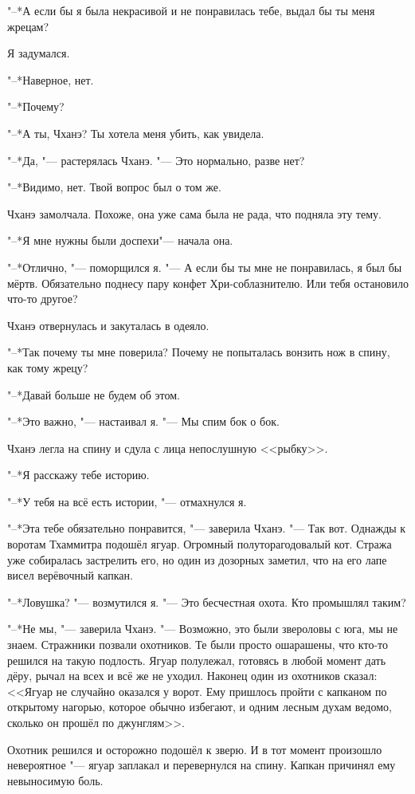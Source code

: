 \documentclass[a4paper,10pt]{book}
\newcommand{\ldotst}{\so{...}\xspace}
\begin{document}
"--*А если бы я была некрасивой и не понравилась тебе, выдал бы ты меня жрецам?

Я задумался.

"--*Наверное, нет.

"--*Почему?

"--*А ты, Чханэ? Ты хотела меня убить, как увидела.

"--*Да, "--- растерялась Чханэ. "--- Это нормально, разве нет?

"--*Видимо, нет. Твой вопрос был о том же.

Чханэ замолчала. Похоже, она уже сама была не рада, что подняла эту тему.

"--*Я\ldotst мне нужны были доспехи\ldotst "--- начала она.

"--*Отлично, "--- поморщился я. "--- А если бы ты мне не понравилась, я был бы 
мёртв. 
Обязательно поднесу пару конфет Хри-соблазнителю. Или тебя остановило что-то 
другое?

Чханэ отвернулась и закуталась в одеяло.

"--*Так почему ты мне поверила? Почему не попыталась вонзить нож в спину, как 
тому жрецу?

"--*Давай больше не будем об этом.

"--*Это важно, "--- настаивал я. "--- Мы спим бок о бок.

Чханэ легла на спину и сдула с лица непослушную <<рыбку>>.

"--*Я расскажу тебе историю.

"--*У тебя на всё есть истории, "--- отмахнулся я.

"--*Эта тебе обязательно понравится, "--- заверила Чханэ. "--- Так вот. Однажды 
к 
воротам Тхаммитра подошёл ягуар. Огромный полуторагодовалый кот. Стража уже 
собиралась застрелить его, но один из дозорных заметил, что на его лапе висел 
верёвочный капкан.

"--*Ловушка? "--- возмутился я. "--- Это бесчестная охота. Кто промышлял таким?

"--*Не мы, "--- заверила Чханэ. "--- Возможно, это были звероловы с юга, мы не 
знаем. Стражники позвали охотников. Те были просто ошарашены, что кто-то 
решился на такую подлость. Ягуар полулежал, готовясь в любой момент дать дёру, 
рычал на всех и всё же не уходил. Наконец один из охотников сказал: <<Ягуар
не случайно оказался у ворот. Ему пришлось пройти с капканом по открытому 
нагорью,
которое обычно избегают, и одним лесным духам ведомо, сколько он прошёл по 
джунглям>>.

Охотник решился и осторожно подошёл к зверю. И в тот момент произошло 
невероятное "--- ягуар заплакал и 
перевернулся на спину. Капкан причинял ему невыносимую боль.
\end{document}
